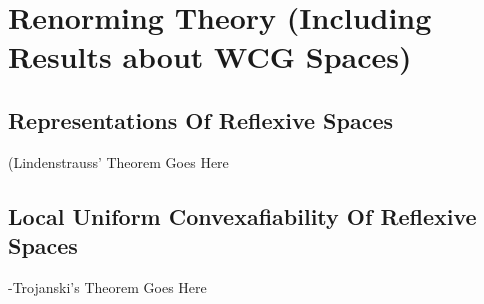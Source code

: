 \chapter{Renorming Theory (Including Results about WCG Spaces)}
\label{ch:thisChapterLabel}

\section{Representations Of Reflexive Spaces}
(Lindenstrauss' Theorem Goes Here %

\section{Local Uniform Convexafiability Of Reflexive Spaces} 
-Trojanski's Theorem Goes Here %
